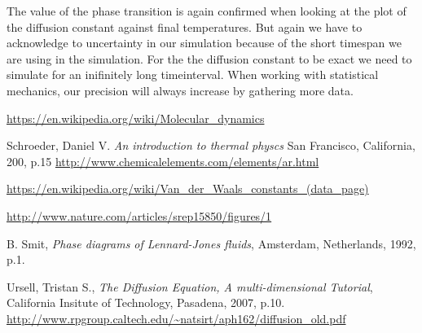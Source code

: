 \documentclass[a4paper, 12pt]{article}
\begin{document}
The value of the phase transition is again confirmed when looking at the plot of the diffusion constant against final temperatures. But again we have to acknowledge to uncertainty in our simulation because of the short timespan we are using in the simulation. For the the diffusion constant to be exact we need to simulate for an inifinitely long timeinterval. When working with statistical mechanics, our precision will always increase by gathering more data.


\newpage
\begin{thebibliography}{H}
\url{https://en.wikipedia.org/wiki/Molecular_dynamics}

Schroeder, Daniel V.
\emph{An introduction to thermal physcs}
San Francisco, California,
200, p.15
\url{http://www.chemicalelements.com/elements/ar.html}

\url{https://en.wikipedia.org/wiki/Van_der_Waals_constants_(data_page)}

\url{http://www.nature.com/articles/srep15850/figures/1}

 B. Smit,
  \emph{Phase diagrams of Lennard-Jones fluids},
  Amsterdam, Netherlands,
  1992, p.1.
  
Ursell, Tristan S.,
	\emph{The Diffusion Equation, A multi-dimensional Tutorial},
	California Insitute of Technology, Pasadena,
	2007, p.10.
	\url{http://www.rpgroup.caltech.edu/~natsirt/aph162/diffusion_old.pdf}

\end{thebibliography}
\end{document}
